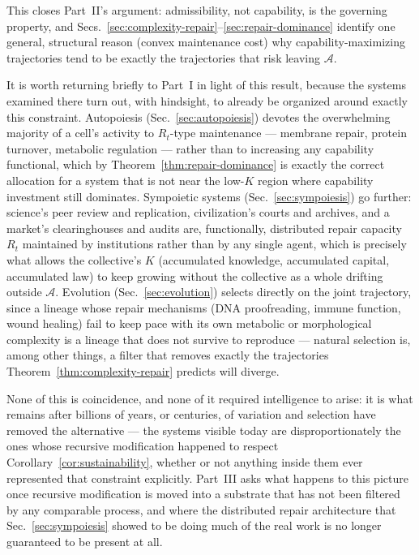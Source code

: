 \documentclass[11pt,a4paper]{article}
\theoremstyle{plain}
\theoremstyle{definition}
\theoremstyle{remark}
\newcommand{\Adm}{\mathcal{A}}
\begin{document}
This closes Part~II's argument: admissibility, not capability, is the governing property, and Secs.~\ref{sec:complexity-repair}--\ref{sec:repair-dominance} identify one general, structural reason (convex maintenance cost) why capability-maximizing trajectories tend to be exactly the trajectories that risk leaving $\Adm$.

It is worth returning briefly to Part~I in light of this result, because the systems examined there turn out, with hindsight, to already be organized around exactly this constraint. Autopoiesis (Sec.~\ref{sec:autopoiesis}) devotes the overwhelming majority of a cell's activity to $R_t$-type maintenance — membrane repair, protein turnover, metabolic regulation — rather than to increasing any capability functional, which by Theorem~\ref{thm:repair-dominance} is exactly the correct allocation for a system that is not near the low-$K$ region where capability investment still dominates. Sympoietic systems (Sec.~\ref{sec:sympoiesis}) go further: science's peer review and replication, civilization's courts and archives, and a market's clearinghouses and audits are, functionally, distributed repair capacity $R_t$ maintained by institutions rather than by any single agent, which is precisely what allows the collective's $K$ (accumulated knowledge, accumulated capital, accumulated law) to keep growing without the collective as a whole drifting outside $\Adm$. Evolution (Sec.~\ref{sec:evolution}) selects directly on the joint trajectory, since a lineage whose repair mechanisms (DNA proofreading, immune function, wound healing) fail to keep pace with its own metabolic or morphological complexity is a lineage that does not survive to reproduce — natural selection is, among other things, a filter that removes exactly the trajectories Theorem~\ref{thm:complexity-repair} predicts will diverge.

None of this is coincidence, and none of it required intelligence to arise: it is what remains after billions of years, or centuries, of variation and selection have removed the alternative — the systems visible today are disproportionately the ones whose recursive modification happened to respect Corollary~\ref{cor:sustainability}, whether or not anything inside them ever represented that constraint explicitly. Part~III asks what happens to this picture once recursive modification is moved into a substrate that has not been filtered by any comparable process, and where the distributed repair architecture that Sec.~\ref{sec:sympoiesis} showed to be doing much of the real work is no longer guaranteed to be present at all.
\end{document}
